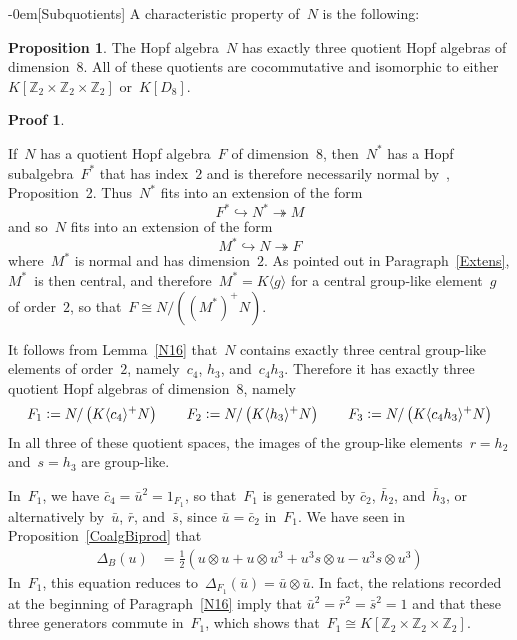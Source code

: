 \documentclass{article}
\makeatletter
\renewcommand{\subsection}{\@startsection{subsection}{2}{0em}%
{\baselineskip}{-0em}{\bfseries\normalsize}}
\newcounter{num}
\newenvironment{pflist}{\begin{list}{(\arabic{num})}{\usecounter{num} \leftmargin0cm \itemindent5pt}}{\end{list}}
\newcounter{num1}
\numberwithin{equation}{section}
\theoremstyle{definition}
\newtheorem*{prop}{Proposition}
\newtheorem*{pf}{Proof}
\theoremstyle{break}
\newcommand{\ot}{\mathbin{\otimes}}
\newcommand{\deq}{\vcentcolon =}
\newcommand{\K}{1}
\newcommand{\1}{{(1)}}
\newcommand{\2}{{(2)}}
\newcommand{\3}{{(3)}}
\newcommand{\db}{\Delta_{B}}
\newcommand{\Z}{{\mathbb Z}}
\makeatother
\begin{document}
\subsection[Subquotients]{} \label{QN16}
A characteristic property of~$N$ is the following:
\begin{prop} \label{3quotients}
The Hopf algebra~$N$ has exactly three quotient Hopf algebras of dimension~$8$. All of these quotients are cocommutative and isomorphic to either $K[\Z_2 \times \Z_2 \times \Z_2]$ or~$K[D_8]$.
\end{prop}
\begin{pf}
\begin{pflist}
\item
If~$N$ has a quotient Hopf algebra~$F$ of dimension~$8$, then~$N^*$ has a Hopf subalgebra~$F^*$ that has index~$2$ and is therefore necessarily normal by~\cite{KoMa}, Proposition~2. Thus~$N^*$ fits into an extension of the form
\[F^* \hookrightarrow N^* \twoheadrightarrow M\]
and so~$N$ fits into an extension of the form
\[M^* \hookrightarrow N \twoheadrightarrow F\]
where~$M^*$ is normal and has dimension~$2$. As pointed out in Paragraph~\ref{Extens}, $M^*$~is then central, and therefore~$M^*=K\langle g \rangle$ for a central group-like element~$g$ of order~$2$, so that~$F \cong N/( (M^*)^+ N)$.

\item
It follows from Lemma~\ref{N16} that~$N$ contains exactly three central group-like elements of order~$2$, namely~$c_4$, $h_3$, and~$c_4 h_3$. Therefore it has exactly three quotient Hopf algebras of dimension~$8$, namely
\[F_1 \deq N/\left( K\langle c_4 \rangle^+ N\right) \qquad
F_2 \deq N/\left( K \langle h_3 \rangle^+ N \right) \qquad
F_3 \deq N/\left( K \langle c_4 h_3 \rangle^+ N \right) \]
In all three of these quotient spaces, the images of the group-like elements~$r=h_2$ and~$s=h_3$ are group-like.

\item
In~$F_1$, we have $\bar{c}_4 = \bar{u}^2 = 1_{F_1}$, so that~$F_1$ is generated by $\bar{c}_2$, $\bar{h}_2$, and~$\bar{h}_3$, or alternatively by~$\bar{u}$, $\bar{r}$, and~$\bar{s}$, since 
$\bar{u} = \bar{c}_2$ in~$F_1$.
We have seen in Proposition~\ref{CoalgBiprod} that
\begin{align*}
\db(u) &= \frac{\K}{2} (u \ot u + u \ot u^3 +  u^3 s \ot u - u^3 s \ot u^3)
\end{align*}
In~$F_1$, this equation reduces to~$\Delta_{F_1}(\bar{u}) = \bar{u} \ot \bar{u}$. In fact, the relations recorded at the beginning of Paragraph~\ref{N16} imply that \mbox{$\bar{u}^2 = \bar{r}^2 = \bar{s}^2 = 1$} and that these three generators commute in~$F_1$, which shows that~$F_1 \cong K[\Z_2 \times \Z_2 \times \Z_2]$.


\end{pflist}
\end{pf}
\end{document}
